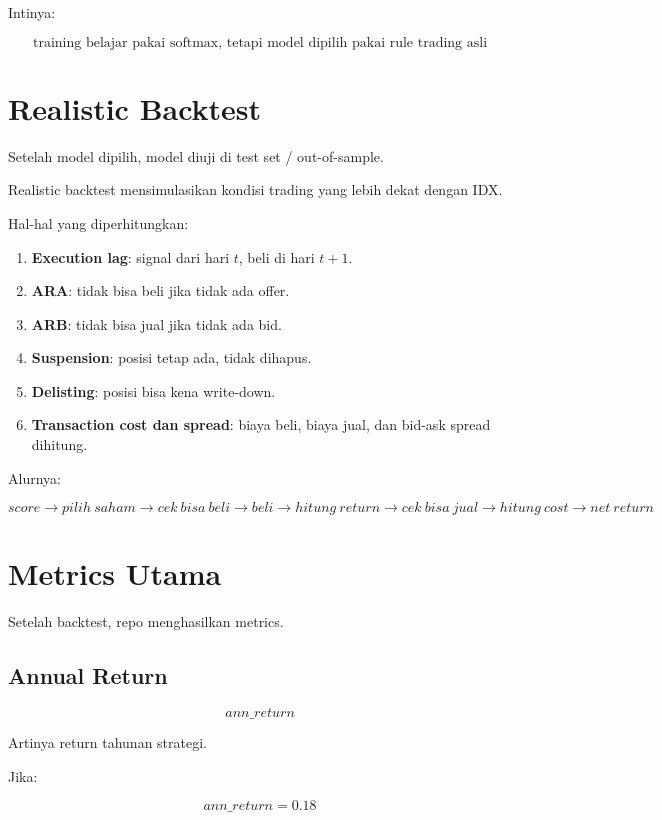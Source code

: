 \documentclass[11pt,a4paper]{article}
\begin{document}
Intinya:

\[
\boxed{
\text{training belajar pakai softmax, tetapi model dipilih pakai rule trading asli}
}
\]

\section{Realistic Backtest}

Setelah model dipilih, model diuji di test set / out-of-sample.

Realistic backtest mensimulasikan kondisi trading yang lebih dekat dengan IDX.

Hal-hal yang diperhitungkan:

\begin{enumerate}[leftmargin=*]
    \item \textbf{Execution lag}:
    signal dari hari \(t\), beli di hari \(t+1\).
    \item \textbf{ARA}:
    tidak bisa beli jika tidak ada offer.
    \item \textbf{ARB}:
    tidak bisa jual jika tidak ada bid.
    \item \textbf{Suspension}:
    posisi tetap ada, tidak dihapus.
    \item \textbf{Delisting}:
    posisi bisa kena write-down.
    \item \textbf{Transaction cost dan spread}:
    biaya beli, biaya jual, dan bid-ask spread dihitung.
\end{enumerate}

Alurnya:

\[
score
\rightarrow
pilih\ saham
\rightarrow
cek\ bisa\ beli
\rightarrow
beli
\rightarrow
hitung\ return
\rightarrow
cek\ bisa\ jual
\rightarrow
hitung\ cost
\rightarrow
net\ return
\]

\section{Metrics Utama}

Setelah backtest, repo menghasilkan metrics.

\subsection{Annual Return}

\[
ann\_return
\]

Artinya return tahunan strategi.

Jika:

\[
ann\_return = 0.18
\]
\end{document}
